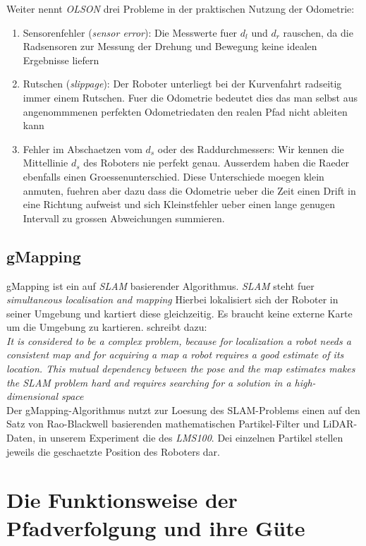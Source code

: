 \documentclass[11pt,a4paper]{article}
\begin{document}
Weiter nennt \textit{OLSON} drei Probleme in der praktischen Nutzung der Odometrie:
\begin{enumerate}
  \item Sensorenfehler (\textit{sensor error}):
  Die Messwerte fuer $d_l$ und $d_r$ rauschen, da die Radsensoren zur Messung der Drehung und Bewegung keine idealen Ergebnisse liefern
  \item Rutschen (\textit{slippage}):
  Der Roboter unterliegt bei der Kurvenfahrt radseitig immer einem Rutschen. Fuer die Odometrie bedeutet dies das man selbst aus angenommmenen perfekten Odometriedaten
  den realen Pfad nicht ableiten kann
  \item Fehler im Abschaetzen vom $d_s$ oder des Raddurchmessers:
  Wir kennen die Mittellinie $d_s$ des Roboters nie perfekt genau. Ausserdem haben die Raeder ebenfalls einen Groessenunterschied. Diese Unterschiede moegen klein 
  anmuten, fuehren aber dazu dass die Odometrie ueber die Zeit einen Drift in eine Richtung aufweist und sich Kleinstfehler ueber einen lange genugen Intervall zu grossen
  Abweichungen summieren. 
\end{enumerate}

\subsection*{gMapping}
gMapping ist ein auf \textit{SLAM} basierender Algorithmus. \textit{SLAM} steht fuer \textit{simultaneous localisation and mapping}\cite{website:mathworksSLAM}
Hierbei lokalisiert sich der Roboter in seiner Umgebung und kartiert diese gleichzeitig. Es braucht keine externe Karte um die Umgebung zu kartieren.
\cite{raoblackwellgmapping} schreibt dazu: \\
\textit{ It is
considered to be a complex problem, because for localization
a robot needs a consistent map and for acquiring a map a
robot requires a good estimate of its location. This mutual
dependency between the pose and the map estimates makes
the SLAM problem hard and requires searching for a solution
in a high-dimensional space} \\
Der gMapping-Algorithmus nutzt zur Loesung des SLAM-Problems einen auf den Satz von Rao-Blackwell basierenden mathematischen Partikel-Filter und LiDAR-Daten\cite{website:openslamgmapping},
in unserem Experiment die des \textit{LMS100}. Dei einzelnen Partikel stellen jeweils die geschaetzte Position des Roboters dar. 

\section{Die Funktionsweise der Pfadverfolgung und ihre Güte}
\end{document}
